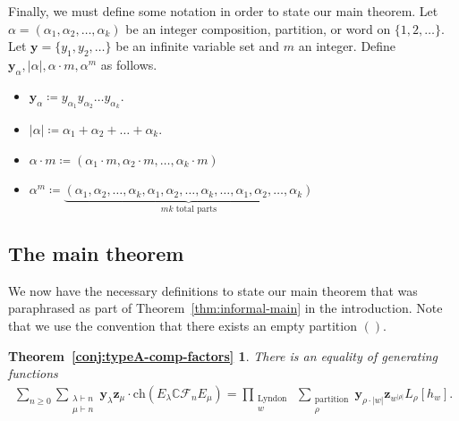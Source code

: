 \documentclass[ALCO, Unicode]{cedram}
\def\ch{\mathrm{ch}}
\def\C{{\mathbb{C}}}
\def\ch{\mathrm{ch}}
\begin{document}
    Finally, we must define some notation in order to state our main theorem. Let \mbox{$\alpha = (\alpha_1, \alpha_2, \ldots, \alpha_k)$} be an integer composition, partition, or word  on $\{1, 2, \ldots \}.$ Let $\mathbf{y} = \{y_1, y_2, \ldots\}$ be an infinite variable set and $m$ an integer. Define \textbf{$\mathbf{y}_\alpha, |\alpha|, \alpha \cdot m, \alpha^m$} as follows.
    \begin{itemize}
        \item $\mathbf{y}_\alpha \coloneqq  y_{\alpha_1}y_{\alpha_2} \ldots y_{\alpha_k}.$ 
         \item $|\alpha| \coloneqq  \alpha_1 + \alpha_2 + \ldots + \alpha_k.$
        \item $\alpha \cdot m \coloneqq  (\alpha_1 \cdot m, \alpha_2 \cdot m, \ldots, \alpha_k \cdot m)$
        \item $\alpha^m \coloneqq  \underbrace{(\alpha_1, \alpha_2, \ldots, \alpha_k, \alpha_1, \alpha_2, \ldots, \alpha_k, \ldots, \alpha_1, \alpha_2, \ldots, \alpha_k)}_{mk \text{ total parts}}$
    \end{itemize}


\subsection{The main theorem}
We now have the necessary definitions to state our main theorem that was paraphrased as part of Theorem~\ref{thm:informal-main} in the introduction. Note that we use the convention that there exists an empty partition $().$

\newtheorem*{conj:typeA-comp-factors}{Theorem~\ref{conj:typeA-comp-factors}}

\begin{conj:typeA-comp-factors} There is an equality of generating functions
\begin{align}\label{eqn:ogf}
    \sum_{n \geq 0} \sum_{\substack{\lambda \vdash n\\ \mu \vdash n}}  \mathbf{y}_\lambda \mathbf{z}_\mu\cdot \ch(E_\lambda \C \mathcal{F}_n E_\mu) = \prod_{\substack{\text{Lyndon }\\ w}} \sum_{\substack{\text{partition}\\\rho}} \mathbf{y}_{\rho \cdot |w|}\mathbf{z}_{w^{|\rho|}}L_\rho[h_w].
\end{align}
\end{conj:typeA-comp-factors} 
\end{document}
